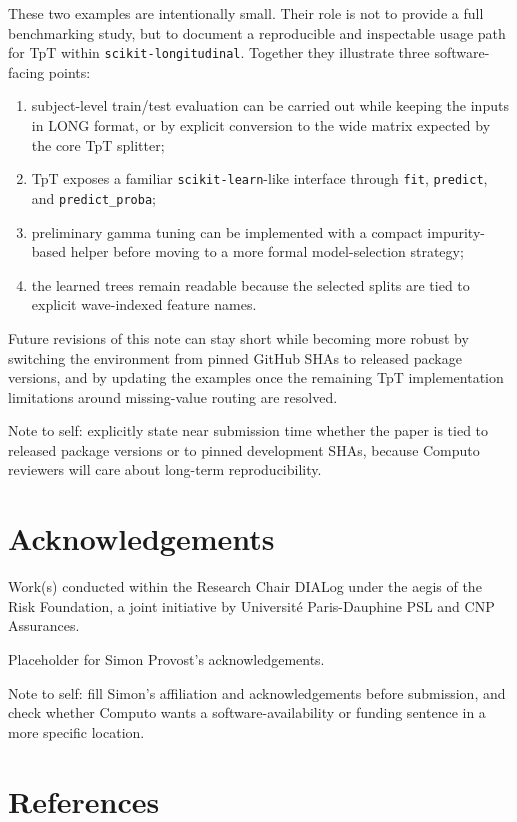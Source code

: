 \documentclass[
  letterpaper,
  DIV=11,
  numbers=noendperiod]{scrartcl}
\providecommand{\tightlist}{%
  \setlength{\itemsep}{0pt}\setlength{\parskip}{0pt}}
\begin{document}
These two examples are intentionally small. Their role is not to provide
a full benchmarking study, but to document a reproducible and
inspectable usage path for TpT within \texttt{scikit-longitudinal}.
Together they illustrate three software-facing points:

\begin{enumerate}
\def\labelenumi{\arabic{enumi}.}
\tightlist
\item
  subject-level train/test evaluation can be carried out while keeping
  the inputs in LONG format, or by explicit conversion to the wide
  matrix expected by the core TpT splitter;
\item
  TpT exposes a familiar \texttt{scikit-learn}-like interface through
  \texttt{fit}, \texttt{predict}, and \texttt{predict\_proba};
\item
  preliminary gamma tuning can be implemented with a compact
  impurity-based helper before moving to a more formal model-selection
  strategy;
\item
  the learned trees remain readable because the selected splits are tied
  to explicit wave-indexed feature names.
\end{enumerate}

Future revisions of this note can stay short while becoming more robust
by switching the environment from pinned GitHub SHAs to released package
versions, and by updating the examples once the remaining TpT
implementation limitations around missing-value routing are resolved.

{Note to self: explicitly state near submission time whether the paper
is tied to released package versions or to pinned development SHAs,
because Computo reviewers will care about long-term reproducibility.}

\section{Acknowledgements}\label{acknowledgements}

Work(s) conducted within the Research Chair DIALog under the aegis of
the Risk Foundation, a joint initiative by Université Paris-Dauphine PSL
and CNP Assurances.

Placeholder for Simon Provost's acknowledgements.

{Note to self: fill Simon's affiliation and acknowledgements before
submission, and check whether Computo wants a software-availability or
funding sentence in a more specific location.}

\section*{References}\label{references}
\end{document}
